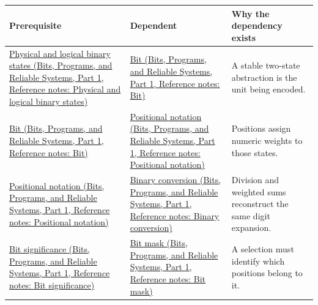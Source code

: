 {\def\LTcaptype{none} %
\begin{longtable}[]{@{}
  >{\raggedright\arraybackslash}p{}
  >{\raggedright\arraybackslash}p{}
  >{\raggedright\arraybackslash}p{}@{}}
\toprule\noalign{}
\begin{minipage}[b]{\linewidth}\raggedright
Prerequisite
\end{minipage} & \begin{minipage}[b]{\linewidth}\raggedright
Dependent
\end{minipage} & \begin{minipage}[b]{\linewidth}\raggedright
Why the dependency exists
\end{minipage} \\
\midrule\noalign{}
\endhead
\bottomrule\noalign{}
\endlastfoot
\href{../01-Bits-Programs-and-Reliable-Systems-P01/main.pdf\#nameddest=appendix-ea798b1ceb35}{Physical and logical binary states (Bits, Programs, and Reliable Systems, Part 1, Reference notes: Physical and logical binary states)} & \href{../01-Bits-Programs-and-Reliable-Systems-P01/main.pdf\#nameddest=appendix-ddbb69998a2e}{Bit (Bits, Programs, and Reliable Systems, Part 1, Reference notes: Bit)} & A stable two-state abstraction is the unit being encoded. \\
\href{../01-Bits-Programs-and-Reliable-Systems-P01/main.pdf\#nameddest=appendix-ddbb69998a2e}{Bit (Bits, Programs, and Reliable Systems, Part 1, Reference notes: Bit)} & \href{../01-Bits-Programs-and-Reliable-Systems-P01/main.pdf\#nameddest=appendix-83c3f28f7bda}{Positional notation (Bits, Programs, and Reliable Systems, Part 1, Reference notes: Positional notation)} & Positions assign numeric weights to those states. \\
\href{../01-Bits-Programs-and-Reliable-Systems-P01/main.pdf\#nameddest=appendix-83c3f28f7bda}{Positional notation (Bits, Programs, and Reliable Systems, Part 1, Reference notes: Positional notation)} & \href{../01-Bits-Programs-and-Reliable-Systems-P01/main.pdf\#nameddest=appendix-dc552784a2c0}{Binary conversion (Bits, Programs, and Reliable Systems, Part 1, Reference notes: Binary conversion)} & Division and weighted sums reconstruct the same digit expansion. \\
\href{../01-Bits-Programs-and-Reliable-Systems-P01/main.pdf\#nameddest=appendix-280445746493}{Bit significance (Bits, Programs, and Reliable Systems, Part 1, Reference notes: Bit significance)} & \href{../01-Bits-Programs-and-Reliable-Systems-P01/main.pdf\#nameddest=appendix-dbe5905163c2}{Bit mask (Bits, Programs, and Reliable Systems, Part 1, Reference notes: Bit mask)} & A selection must identify which positions belong to it. \\

\end{longtable}}
